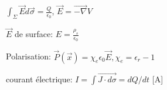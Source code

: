  \squishlist
    \item $\int_{\Sigma} \vec{E} d\vec{\sigma}  = \frac{Q}{\epsilon_0}$, $\vec E = \vec{-\nabla} V$
    \item $\vec{E}$ de surface: $E=\frac{\rho_s}{\epsilon_0}$
    \item Polarisation: $\vec{P} (\vec{x}) = \chi_e \epsilon_0 \vec{E} , \chi_e = \epsilon_r -1$
    \item courant électrique: $I=\int \vec{J\cdot d\sigma} = dQ/dt $ [A]
 \squishend